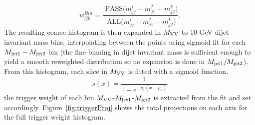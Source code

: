 \begin{equation*}
w^{Bin}_{ijk}= \frac{\textrm{ PASS}\big(m_{jj}^i-m_{j1}^j-m_{j2}^k\big) }{\textrm{ ALL}\big(m_{jj}^i-m_{j1}^j-m_{j2}^k\big)}.
\end{equation*}
The resulting coarse histogram is then expanded in $M_{\rm VV}$ to 10 GeV dijet invariant mass bins, interpolating between the points using sigmoid fit for each $M_{\rm jet1}-M_{\rm jet2}$ bin (the fine binning in dijet invariant mass is sufficient enough to yield a smooth reweighted distribution so no expansion is done in $M_{\rm jet1}/M_{\rm jet2}$).
From this histogram, each slice in $M_{\rm VV}$ is fitted with a sigmoid function,
\begin{equation*}
s(x)=\frac{1}{1+e^{-p_1(x-p_2)}}
\end{equation*}
the trigger weight of each bin $M_{\rm VV}$-$M_{\rm jet1}$-$M_{\rm jet2}$ is extracted from the fit and set accordingly.
Figure~\ref{fig:triggerProj} shows the total projections on each axis for the full trigger weight histogram.
